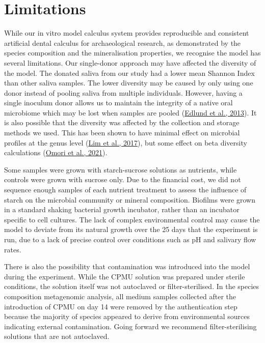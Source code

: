 \documentclass[
  letterpaper,
]{book}
\begin{document}
\hypertarget{limitations}{%
\section{Limitations}\label{limitations}}

While our in vitro model calculus system provides reproducible and
consistent artificial dental calculus for archaeological research, as
demonstrated by the species composition and the mineralisation
properties, we recognise the model has several limitations. Our
single-donor approach may have affected the diversity of the model. The
donated saliva from our study had a lower mean Shannon Index than other
saliva samples. The lower diversity may be caused by only using one
donor instead of pooling saliva from multiple individuals. However,
having a single inoculum donor allows us to maintain the integrity of a
native oral microbiome which may be lost when samples are pooled
(\protect\hyperlink{ref-edlundBiofilmModel2013}{Edlund et al., 2013}).
It is also possible that the diversity was affected by the collection
and storage methods we used. This has been shown to have minimal effect
on microbial profiles at the genus level
(\protect\hyperlink{ref-limSalivaMicrobiome2017}{Lim et al., 2017}), but
some effect on beta diversity calculations
(\protect\hyperlink{ref-omoriComparativeEvaluation2021}{Omori et al.,
2021}).

Some samples were grown with starch-sucrose solutions as nutrients,
while controls were grown with sucrose only. Due to the financial cost,
we did not sequence enough samples of each nutrient treatment to assess
the influence of starch on the microbial community or mineral
composition. Biofilms were grown in a standard shaking bacterial growth
incubator, rather than an incubator specific to cell cultures. The lack
of complex environmental control may cause the model to deviate from its
natural growth over the 25 days that the experiment is run, due to a
lack of precise control over conditions such as pH and salivary flow
rates.

There is also the possibility that contamination was introduced into the
model during the experiment. While the CPMU solution was prepared under
sterile conditions, the solution itself was not autoclaved or
filter-sterilised. In the species composition metagenomic analysis, all
medium samples collected after the introduction of CPMU on day 14 were
removed by the authentication step because the majority of species
appeared to derive from environmental sources indicating external
contamination. Going forward we recommend filter-sterilising solutions
that are not autoclaved.
\end{document}
